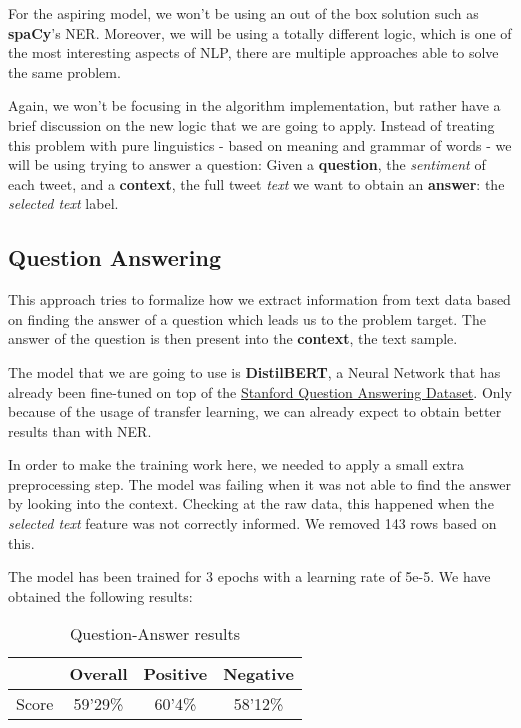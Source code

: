 \documentclass[11pt]{article}
\begin{document}
For the aspiring model, we won't be using an out of the box solution such as \textbf{spaCy}'s NER. Moreover, we will be using a totally different logic, which is one of the most interesting aspects of NLP, there are multiple approaches able to solve the same problem.

Again, we won't be focusing in the algorithm implementation, but rather have a brief discussion on the new logic that we are going to apply. Instead of treating this problem with pure linguistics - based on meaning and grammar of words - we will be using trying to answer a question: Given a \textbf{question}, the \textit{sentiment} of each tweet, and a \textbf{context}, the full tweet \textit{text} we want to obtain an \textbf{answer}: the \textit{selected text} label.

\subsection{Question Answering}

This approach tries to formalize how we extract information from text data based on finding the answer of a question which leads us to the problem target. The answer of the question is then present into the \textbf{context}, the text sample.

The model that we are going to use is \textbf{DistilBERT}, a Neural Network that has already been fine-tuned on top of the \href{https://rajpurkar.github.io/SQuAD-explorer/}{Stanford Question Answering Dataset}. Only because of the usage of transfer learning, we can already expect to obtain better results than with NER.

In order to make the training work here, we needed to apply a small extra preprocessing step. The model was failing when it was not able to find the answer by looking into the context. Checking at the raw data, this happened when the \textit{selected text} feature was not correctly informed. We removed 143 rows based on this.

The model has been trained for 3 epochs with a learning rate of 5e-5. We have obtained the following results:

\begin{table}[h]
\centering
\begin{tabular}{c|c|c|c}
\hline
\hline
 & Overall & Positive & Negative \\ \hline
Score & 59'29\% & 60'4\% & 58'12\% \\ 
\hline
\hline
\end{tabular}
\caption{Question-Answer results}
\label{tab:bench-results}
\end{table}
\end{document}
